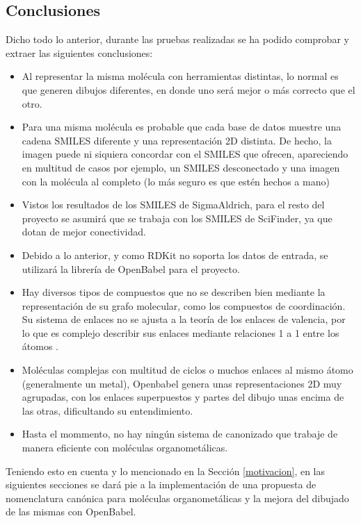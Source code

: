 \subsection{Conclusiones}
Dicho todo lo anterior, durante las pruebas realizadas se ha podido comprobar y extraer las siguientes conclusiones:

\begin{itemize}
    \item Al representar la misma molécula con herramientas distintas, lo normal es que generen dibujos diferentes, en donde uno será mejor o más correcto que el otro.
    \item Para una misma molécula es probable que cada base de datos muestre una cadena SMILES diferente y una representación 2D distinta. De hecho, la imagen puede ni siquiera concordar con el SMILES que ofrecen, apareciendo en multitud de casos por ejemplo, un SMILES desconectado y una imagen con la molécula al completo (lo más seguro es que estén hechos a mano)
    \item Vistos los resultados de los SMILES de SigmaAldrich, para el resto del proyecto se asumirá que se trabaja con los SMILES de SciFinder, ya que dotan de mejor conectividad. 
    \item Debido a lo anterior, y como RDKit no soporta los datos de entrada, se utilizará la librería de OpenBabel para el proyecto.
    \item Hay diversos tipos de compuestos que no se describen bien mediante la representación de su grafo molecular, como los compuestos de coordinación. Su sistema de enlaces no se ajusta a la teoría de los enlaces de valencia, por lo que es complejo describir sus enlaces mediante relaciones 1 a 1 entre los átomos \cite{david_molecular_2020}.
    \item Moléculas complejas con multitud de ciclos o muchos enlaces al mismo átomo (generalmente un metal), Openbabel genera unas representaciones 2D muy agrupadas, con los enlaces superpuestos y partes del dibujo unas encima de las otras, dificultando su entendimiento.
    \item Hasta el mommento, no hay ningún sistema de canonizado que trabaje de manera eficiente con moléculas organometálicas.
    
\end{itemize}


Teniendo esto en cuenta y lo mencionado en la Sección \ref{motivacion}, en las siguientes secciones se dará pie a la implementación de una propuesta de nomenclatura canónica para moléculas organometálicas y la mejora del dibujado de las mismas con OpenBabel.





